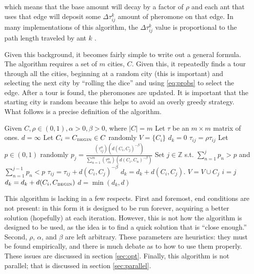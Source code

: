\documentclass[twocolumn]{article}
\begin{document}
which means that the base amount will decay by a factor of $\rho$ and each ant
that uses that edge will deposit some $\Delta\tau^k_{ij}$ amount of pheromone on
that edge. In many implementations of this algorithm, the $\Delta\tau^k_{ij}$
value is proportional to the path length traveled by ant $k$ \cite{iridia:aco} 
\cite{ipcsit:aco} \cite{jungblut:aco}.  

Given this background, it becomes fairly simple to write out a general 
formula. The algorithm requires a set of $m$ cities, $C$. Given this, 
it repeatedly finds a tour through all the cities, beginning at a random city
(this is important) and selecting the next city by ``rolling the dice'' and
using \eqref{eq:probs} to select the edge. After a tour is found, the 
pheromones are updated. It is important that the starting city is random 
because this helps to avoid an overly greedy strategy. What follows is a
precise definition of the algorithm. 

\begin{algorithmic}
  \State Given $C, \rho \in (0,1), \alpha > 0, \beta > 0$, where $|C| = m$
  \State Let $\tau$ be an $m \times m$ matrix of ones.
  \State $d = \infty$
    \State Let $C_i = C_{\mbox{{\tiny BEGIN}}}\in C$ randomly
    \State $V = \{ C_i \}$
    \State $d_k = 0$
    \State $\tau_{ij} = \rho \tau_{ij}$
       \State Let $p \in (0,1)$ randomly
       \State $\displaystyle p_j = \frac{(\tau_{ij}^\alpha)(d(C_i,C_j)^{-\beta})}{\sum_{n=1}^m 
         (\tau_{in}^\alpha) (d(C_i,C_n)^{-\beta})}$
       \State Set $j \in \mathbb{Z}$ s.t. $\displaystyle \sum_{n=1}^j p_n > p$ and 
       $\displaystyle \sum_{n=1}^{j-1} p_n < p$
       \State $\tau_{ij} = \tau_{ij} + d(C_i,C_j)^{-\beta}$
       \State $d_k = d_k + d(C_i,C_j)$.
       \State $V = V \cup C_j$
       \State $i = j$
    \EndWhile
    \State $d_k = d_k + d(C_i,C_{\mbox{{\tiny BEGIN}}})$
    \State $d = \min (d_k, d)$
  \EndFor 
\end{algorithmic}

This algorithm is lacking in a few respects. First and foremost, end conditions are not present:
in this form it is designed to be run forever, acquiring a better solution (hopefully) at each
iteration. However, this is not how the algorithm is designed to be used, as the idea is to find
a quick solution that is ``close enough.'' Second, $\rho$, $\alpha$, and $\beta$ are left 
arbitrary. These parameters are heuristics: they must be found empirically, and there is much 
debate as to how to use them properly. These issues are discussed in section \ref{sec:opt}.
Finally, this algorithm is not parallel; that is discussed in section \ref{sec:parallel}. 
\end{document}
